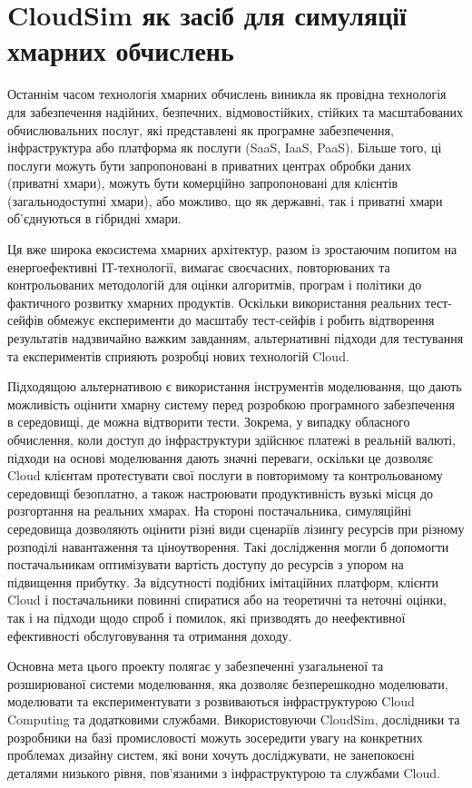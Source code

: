 \section{CloudSim як засіб для симуляції хмарних обчислень}

Останнім часом технологія хмарних обчислень виникла як провідна технологія для забезпечення надійних, безпечних, відмовостійких, стійких та масштабованих обчислювальних послуг, які представлені як програмне забезпечення, інфраструктура або платформа як послуги (SaaS, IaaS, PaaS). Більше того, ці послуги можуть бути запропоновані в приватних центрах обробки даних (приватні хмари), можуть бути комерційно запропоновані для клієнтів (загальнодоступні хмари), або можливо, що як державні, так і приватні хмари об'єднуються в гібридні хмари.

Ця вже широка екосистема хмарних архітектур, разом із зростаючим попитом на енергоефективні ІТ-технології, вимагає своєчасних, повторюваних та контрольованих методологій для оцінки алгоритмів, програм і політики до фактичного розвитку хмарних продуктів. Оскільки використання реальних тест-сейфів обмежує експерименти до масштабу тест-сейфів і робить відтворення результатів надзвичайно важким завданням, альтернативні підходи для тестування та експериментів сприяють розробці нових технологій Cloud.

Підходящою альтернативою є використання інструментів моделювання, що дають можливість оцінити хмарну систему перед розробкою програмного забезпечення в середовищі, де можна відтворити тести. Зокрема, у випадку обласного обчислення, коли доступ до інфраструктури здійснює платежі в реальній валюті, підходи на основі моделювання дають значні переваги, оскільки це дозволяє Cloud клієнтам протестувати свої послуги в повторимому та контрольованому середовищі безоплатно, а також настроювати продуктивність вузькі місця до розгортання на реальних хмарах. На стороні постачальника, симуляційні середовища дозволяють оцінити різні види сценаріїв лізингу ресурсів при різному розподілі навантаження та ціноутворення. Такі дослідження могли б допомогти постачальникам оптимізувати вартість доступу до ресурсів з упором на підвищення прибутку. За відсутності подібних імітаційних платформ, клієнти Cloud і постачальники повинні спиратися або на теоретичні та неточні оцінки, так і на підходи щодо спроб і помилок, які призводять до неефективної ефективності обслуговування та отримання доходу.

Основна мета цього проекту полягає у забезпеченні узагальненої та розширюваної системи моделювання, яка дозволяє безперешкодно моделювати, моделювати та експериментувати з розвиваються інфраструктурою Cloud Computing та додатковими службами. Використовуючи CloudSim, дослідники та розробники на базі промисловості можуть зосередити увагу на конкретних проблемах дизайну систем, які вони хочуть досліджувати, не занепокоєні деталями низького рівня, пов'язаними з інфраструктурою та службами Cloud.

